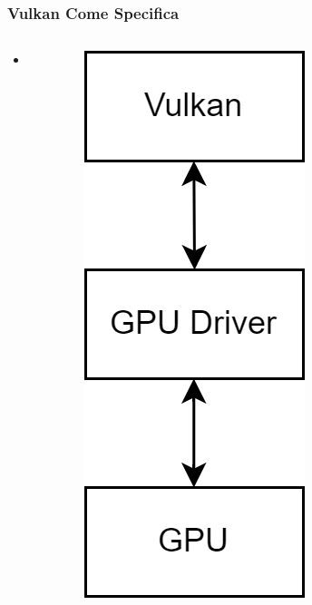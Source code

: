 \begin{frame}
\frametitle{Vulkan Come Specifica}
\begin{columns}


\begin{itemize}
\item

\end{itemize}


\begin{figure}[ht]
    \centering
    \includegraphics[scale=0.2]{images/SlidesVulkan/VulkanSpecification.png}
\end{figure}

\end{columns}
\end{frame}
